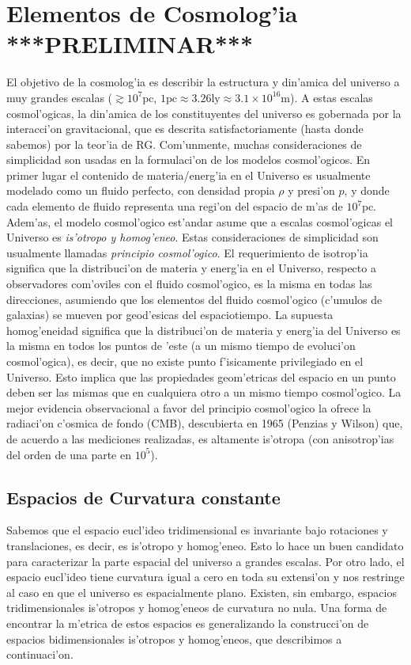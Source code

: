 \chapter{Elementos de Cosmolog'ia ***PRELIMINAR***}
El objetivo de la cosmolog'ia es describir la estructura y din'amica del universo a muy grandes escalas ($\gtrsim 10^{7}\text{pc}$, $1\text{pc}\approx 3.26\text{ly}\approx 3.1\times 10^{16}\text{m}$). A estas escalas cosmol'ogicas, la din'amica de los constituyentes del universo es gobernada por la interacci'on gravitacional, que es descrita satisfactoriamente (hasta donde sabemos) por la teor'ia de RG.
Com'unmente, muchas consideraciones de simplicidad son usadas en la formulaci'on de los modelos cosmol'ogicos. 
En primer lugar el contenido de materia/energ'ia en el Universo es usualmente modelado como un fluido perfecto, 
con densidad propia $\rho$ y presi'on $p$, y donde cada elemento de fluido representa una regi'on del espacio de m'as de $10^{7}\text{pc}$. Adem'as, el modelo cosmol'ogico est'andar asume que a escalas cosmol'ogicas el Universo es \textit{is'otropo y homog'eneo}. Estas consideraciones de simplicidad son usualmente llamadas \textit{principio cosmol'ogico}. El requerimiento de isotrop'ia significa que la distribuci'on de materia y energ'ia en el Universo, respecto a observadores com'oviles con el fluido cosmol'ogico, es la misma en todas las direcciones, asumiendo que los elementos del fluido cosmol'ogico (c'umulos de galaxias) se mueven por geod'esicas del espaciotiempo.
La supuesta homog'eneidad significa que la distribuci'on de materia y energ'ia del Universo es la misma en todos los puntos de 'este (a un mismo tiempo de evoluci'on cosmol'ogica), es decir, que no existe punto f'isicamente privilegiado en el 
Universo. Esto implica que las propiedades geom'etricas del espacio en un punto deben ser las mismas que en cualquiera otro a un mismo tiempo cosmol'ogico.
La mejor evidencia observacional a favor del principio cosmol'ogico la ofrece la radiaci'on c'osmica de fondo (CMB), descubierta en 1965 (Penzias y Wilson) que, de acuerdo a las mediciones realizadas, es altamente is'otropa (con anisotrop'ias del orden de una parte en $10^5$).
\section{Espacios de Curvatura constante}
Sabemos que el espacio eucl'ideo tridimensional es invariante bajo rotaciones y translaciones, es decir, es is'otropo y homog'eneo. Esto lo hace un buen candidato para caracterizar la parte espacial del universo a grandes escalas. Por otro lado, el espacio eucl'ideo tiene curvatura igual a cero en toda su extensi'on y nos restringe al caso en que el universo es espacialmente plano. Existen, sin embargo, espacios tridimensionales is'otropos y homog'eneos de curvatura no nula. Una forma de encontrar la m'etrica de estos espacios es generalizando la construcci'on de espacios bidimensionales is'otropos y homog'eneos, que describimos a continuaci'on.

